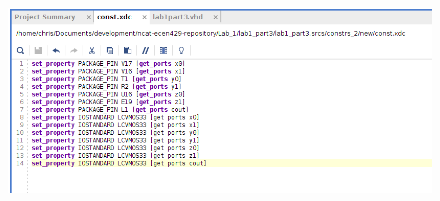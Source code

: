 \documentclass[11pt]{article}
\begin{document}
\begin{appendices}
\begin{figure}[h]
	\includegraphics[width=\textwidth]{report_images/img7}
\end{figure}

\end{appendices}
\end{document}
